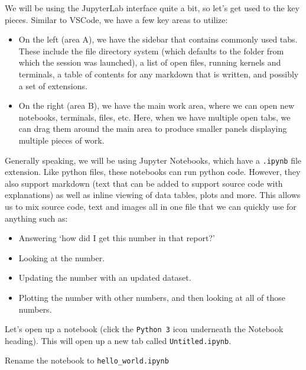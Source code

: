 \documentclass[
  letterpaper,
  DIV=11,
  numbers=noendperiod]{scrreprt}
\providecommand{\tightlist}{%
  \setlength{\itemsep}{0pt}\setlength{\parskip}{0pt}}\usepackage{longtable,booktabs,array}
\begin{document}
We will be using the JupyterLab interface quite a bit, so let's get used
to the key pieces. Similar to VSCode, we have a few key areas to
utilize:

\begin{itemize}
\item
  On the left (area A), we have the sidebar that contains commonly used
  tabs. These include the file directory system (which defaults to the
  folder from which the session was launched), a list of open files,
  running kernels and terminals, a table of contents for any markdown
  that is written, and possibly a set of extensions.
\item
  On the right (area B), we have the main work area, where we can open
  new notebooks, terminals, files, etc. Here, when we have multiple open
  tabs, we can drag them around the main area to produce smaller panels
  displaying multiple pieces of work.
\end{itemize}

Generally speaking, we will be using Jupyter Notebooks, which have a
\texttt{.ipynb} file extension. Like python files, these notebooks can
run python code. However, they also support markdown (text that can be
added to support source code with explanations) as well as inline
viewing of data tables, plots and more. This allows us to mix source
code, text and images all in one file that we can quickly use for
anything such as:

\begin{itemize}
\tightlist
\item
  Answering `how did I get this number in that report?'
\item
  Looking at the number.
\item
  Updating the number with an updated dataset.
\item
  Plotting the number with other numbers, and then looking at all of
  those numbers.
\end{itemize}

Let's open up a notebook (click the \texttt{Python\ 3} icon underneath
the Notebook heading). This will open up a new tab called
\texttt{Untitled.ipynb}.

\begin{tcolorbox}[enhanced jigsaw, rightrule=.15mm, opacitybacktitle=0.6, colback=white, toprule=.15mm, colframe=quarto-callout-warning-color-frame, bottomtitle=1mm, bottomrule=.15mm, arc=.35mm, coltitle=black, breakable, title={Challenge 3}, titlerule=0mm, opacityback=0, colbacktitle=quarto-callout-warning-color!10!white, left=2mm, toptitle=1mm, leftrule=.75mm]
Rename the notebook to \texttt{hello\_world.ipynb}
\end{tcolorbox}
\end{document}
